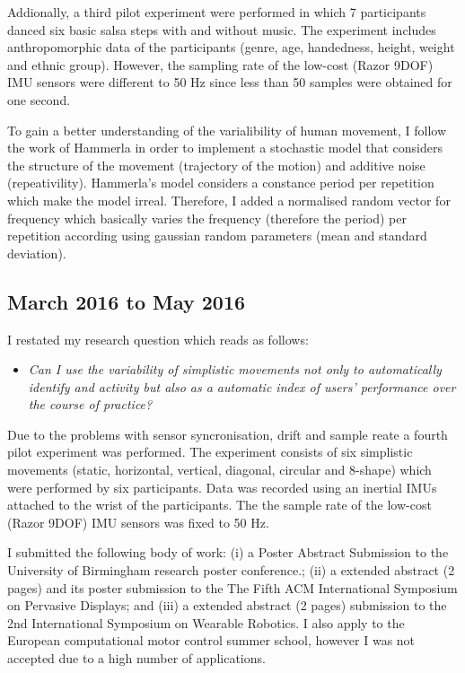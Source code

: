 \documentclass[12pt,journal,onecolumn,compsoc]{IEEEtran}
\begin{document}
Addionally, a third pilot experiment were performed in which 7 participants danced 
six basic salsa steps with and without music.
The experiment includes anthropomorphic data of the participants 
(genre, age, handedness, height, weight and ethnic group).
However, the sampling rate of the low-cost (Razor 9DOF) IMU sensors were 
different to 50 Hz since less than 50 samples were obtained for one second. 


To gain a better understanding of the varialibility of human movement,
I follow the work of Hammerla in order to implement a stochastic model 
that considers the structure of the movement (trajectory of the motion) and additive noise (repeativility).
Hammerla's model considers a constance period per repetition which make the model irreal.
Therefore, I added a normalised random vector for frequency which basically varies the frequency 
(therefore the period) per repetition according using gaussian random parameters (mean and standard deviation).


\subsection{March 2016 to May 2016}

I restated my research question which reads as follows:
\begin{itemize}
 \item \textit{Can I use the variability of simplistic movements not only to automatically identify
and activity but also as a automatic index of users' performance over the course of practice?}
\end{itemize}

Due to the problems with sensor syncronisation, drift and sample reate a fourth pilot experiment
was performed. The experiment consists of six simplistic movements 
(static, horizontal, vertical, diagonal, circular and 8-shape)
which were performed by six participants. 
Data was recorded using 
an inertial IMUs attached to the wrist of the participants.
The the sample rate of the low-cost (Razor 9DOF) IMU sensors 
was fixed to 50 Hz.

I submitted the following body of work:
(i) a Poster Abstract Submission to the University of Birmingham research poster conference.;
(ii) a extended abstract (2 pages)  and its poster submission to the The Fifth ACM International 
Symposium on Pervasive Displays; and
(iii) a extended abstract (2 pages) submission to the 2nd International Symposium on Wearable Robotics.
I also apply to the European computational motor control summer school,
however I was not accepted due to a high number of applications.
\end{document}
